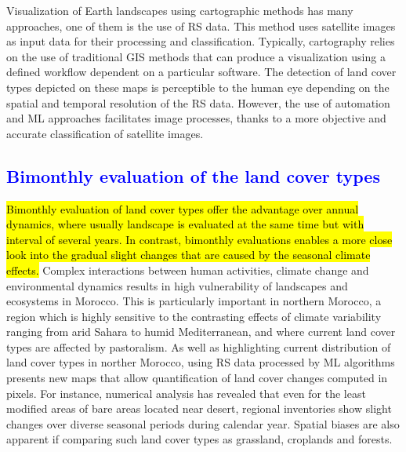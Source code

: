 \documentclass[geomatics,article,submit,pdftex,moreauthors]{Definitions/mdpi}
\begin{document}
Visualization of Earth landscapes using cartographic methods has many approaches, one of them is the use of RS data. This method uses satellite images as input data for their processing and classification. Typically, cartography relies on the use of traditional GIS methods that can produce a visualization using a defined workflow dependent on a particular software. The detection of land cover types depicted on these maps is perceptible to the human eye depending on the spatial and temporal resolution of the RS data. However, the use of automation and ML approaches facilitates image processes, thanks to a more objective and accurate classification of satellite images.

\subsection{\textcolor{blue}{Bimonthly evaluation of the land cover types}}

\hl{Bimonthly evaluation of land cover types offer the advantage over annual dynamics, where usually landscape is evaluated at the same time but with interval of several years. In contrast, bimonthly evaluations enables a more close look into the gradual slight changes that are caused by the seasonal climate effects. }Complex interactions between human activities, climate change and environmental dynamics results in high vulnerability of landscapes and ecosystems in Morocco. This is particularly important in northern Morocco, a region which is highly sensitive to the contrasting effects of climate variability ranging from arid Sahara to humid Mediterranean, and where current land cover types are affected by pastoralism. As well as highlighting current distribution of land cover types in norther Morocco, using RS data processed by ML algorithms presents new maps that allow quantification of land cover changes computed in pixels. For instance, numerical analysis has revealed that even for the least modified areas of bare areas located near desert, regional inventories show slight changes over diverse seasonal periods during calendar year. Spatial biases are also apparent if comparing such land cover types as grassland, croplands and forests.
\end{document}
